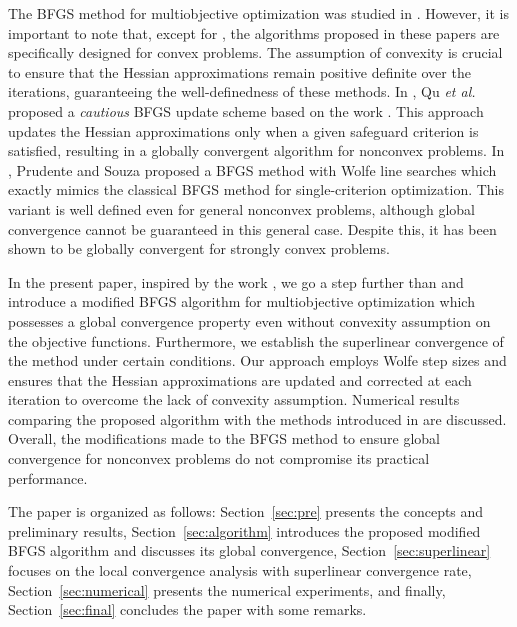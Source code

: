 \documentclass[11pt]{article}
\numberwithin{assumption}{section}
\begin{document}
The BFGS method for multiobjective optimization was studied in \cite{Leandro&Danilo,Lapucci2023,POVALEJ2014765,math8040616,superlinearly,Morovati2017,QU2011397,QU2014503}. However, it is important to note that, except for \cite{Leandro&Danilo,QU2011397}, the algorithms proposed in these papers are specifically designed for convex problems. The assumption of convexity is crucial to ensure that the Hessian approximations remain positive definite over the iterations, guaranteeing the well-definedness of these methods.
In \cite{QU2011397}, Qu {\it et al.} proposed a {\it cautious} BFGS update scheme based on the work \cite{Li-Fu-SIAM}.
This approach updates the Hessian approximations only when a given safeguard criterion is satisfied, resulting in a globally convergent algorithm for nonconvex problems.
In \cite{Leandro&Danilo}, Prudente and Souza proposed a BFGS method with Wolfe line searches which exactly mimics the classical BFGS method for single-criterion optimization. This variant is well defined even for general nonconvex problems, although global convergence cannot be guaranteed in this general case. 
Despite this, it has been shown to be globally convergent for strongly convex problems.

In the present paper, inspired by the work \cite{Li-Fu-MBFGS}, we go a step further than \cite{Leandro&Danilo} and introduce a modified BFGS algorithm for multiobjective optimization which possesses a global convergence property even without convexity assumption on the objective functions. Furthermore, we establish the superlinear convergence of the method under certain conditions. Our approach employs Wolfe step sizes and ensures that the Hessian approximations are updated and corrected at each iteration to overcome the lack of convexity assumption. Numerical results comparing the proposed algorithm with the methods introduced in \cite{Leandro&Danilo,QU2011397} are discussed. Overall, the modifications made to the BFGS method to ensure global convergence for nonconvex problems do not compromise its practical performance.

The paper is organized as follows: Section~\ref{sec:pre} presents the concepts and preliminary results, Section~\ref{sec:algorithm} introduces the proposed modified BFGS algorithm and discusses its global convergence, Section~\ref{sec:superlinear} focuses on the local convergence analysis with superlinear convergence rate, Section~\ref{sec:numerical} presents the numerical experiments, and finally, Section~\ref{sec:final} concludes the paper with some remarks.
\end{document}
